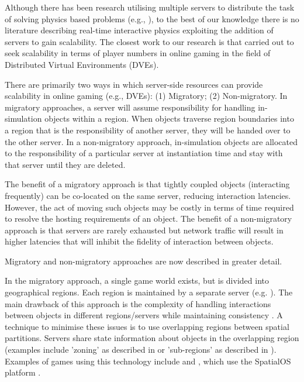 Although there has been research utilising multiple servers to distribute the task of solving physics based problems (e.g., \cite{mashayekhi2018automatically}), to the best of our knowledge there is no literature describing real-time interactive physics exploiting the addition of servers to gain scalability. The closest work to our research is that carried out to seek scalability in terms of player numbers in online gaming in the field of Distributed Virtual Environments (DVEs). 

There are primarily two ways in which server-side resources can provide scalability in online gaming (e.g., DVEs): (1) Migratory; (2) Non-migratory. In migratory approaches, a server will assume responsibility for handling in-simulation objects within a region. When objects traverse region boundaries into a region that is the responsibility of another server, they will be handed over to the other server. In a non-migratory approach, in-simulation objects are allocated to the responsibility of a particular server at instantiation time and stay with that server until they are deleted.

The benefit of a migratory approach is that tightly coupled objects (interacting frequently) can be co-located on the same server, reducing interaction latencies. However, the act of moving such objects may be costly in terms of time required to resolve the hosting requirements of an object. The benefit of a non-migratory approach is that servers are rarely exhausted but network traffic will result in higher latencies that will inhibit the fidelity of interaction between objects.

Migratory and non-migratory approaches are now described in greater detail.

In the migratory approach, a single game world exists, but is divided into geographical regions. Each region is maintained by a separate server (e.g. \cite{AnOverlappingArchitecture, ScalabilityIssues, LoadBalancingForDistributedVR, ALoadBalancingAlgorithm, SpatialOS}). The main drawback of this approach is the complexity of handling interactions between objects in different regions/servers while maintaining consistency \cite{P2PForMMOs}. A technique to minimise these issues is to use overlapping regions between spatial partitions. Servers share state information about objects in the overlapping region (examples include 'zoning' as described in \cite{AnOverlappingArchitecture} or 'sub-regions' as described in \cite{ScalabilityIssues}). Examples of games using this technology include \cite{Vanishin30:online} and \cite{WorldsAd48:online}, which use the SpatialOS platform \cite{SpatialOS}. %
 
